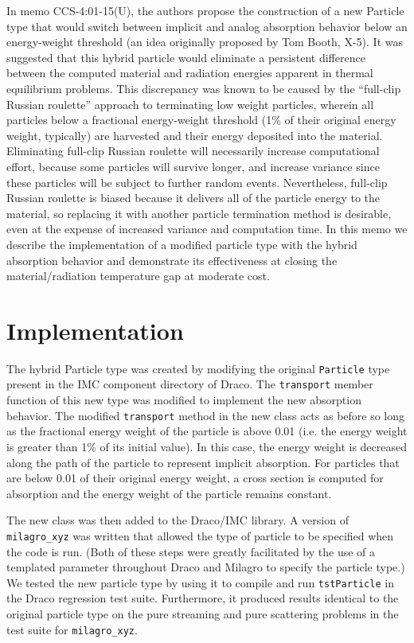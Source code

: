 \documentclass[11pt]{nmemo}
\begin{document}
In memo CCS-4:01-15(U), the authors propose the construction of a new
Particle type that would switch between implicit and analog absorption
behavior below an energy-weight threshold (an idea originally proposed
by Tom Booth, X-5). It was suggested that this hybrid particle would
eliminate a persistent difference between the computed material and
radiation energies apparent in thermal equilibrium problems. This
discrepancy was known to be caused by the ``full-clip Russian
roulette'' approach to terminating low weight particles, wherein all
particles below a fractional energy-weight threshold (1\% of their
original energy weight, typically) are harvested and their energy
deposited into the material.  Eliminating full-clip Russian roulette
will necessarily increase computational effort, because some particles
will survive longer, and increase variance since these particles will
be subject to further random events.  Nevertheless, full-clip Russian
roulette is biased because it delivers all of the particle energy to
the material, so replacing it with another particle termination method
is desirable, even at the expense of increased variance and
computation time. In this memo we describe the implementation of a
modified particle type with the hybrid absorption behavior and
demonstrate its effectiveness at closing the material/radiation
temperature gap at moderate cost.

\section{Implementation}

The hybrid Particle type was created by modifying the original
\texttt{Particle} type present in the IMC component directory of
Draco.  The \texttt{transport} member function of this new type was
modified to implement the new absorption behavior. The modified
\texttt{transport} method in the new class acts as before so long as
the fractional energy weight of the particle is above 0.01 (i.e. the
energy weight is greater than 1\% of its initial value). In this case,
the energy weight is decreased along the path of the particle to
represent implicit absorption. For particles that are below 0.01 of
their original energy weight, a cross section is computed for
absorption and the energy weight of the particle remains constant.

The new class was then added to the Draco/IMC library. A version of
\texttt{milagro\_xyz} was written that allowed the type of particle to
be specified when the code is run. (Both of these steps were greatly
facilitated by the use of a templated parameter throughout Draco and
Milagro to specify the particle type.) We tested the new particle type
by using it to compile and run \texttt{tstParticle} in the Draco
regression test suite. Furthermore, it produced results identical to
the original particle type on the pure streaming and pure scattering
problems in the test suite for \texttt{milagro\_xyz}.
\end{document}
